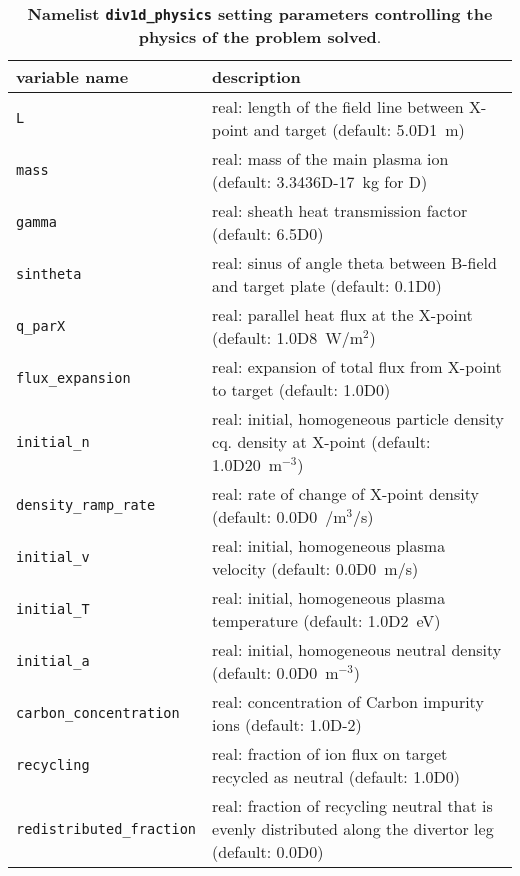 \documentclass[amsmath,amssymb,a4]{revtex4-2}
\begin{document}
\begin{table}[h]
\begin{center}
  \caption{{\bf Namelist {\tt div1d\_physics} setting parameters controlling the physics of the problem solved}.}
  \label{tab:input_physics}
  \begin{tabular}{|| l  | l ||}
    \hline\hline
    variable name                & description \\ \hline\hline
    {\tt L}                      & real: length of the field line between X-point and target (default: 5.0D1~m) \\ \hline
    {\tt mass}                   & real: mass of the main plasma ion (default: 3.3436D-17~kg for D) \\ \hline
    {\tt gamma}                  & real: sheath heat transmission factor (default: 6.5D0) \\ \hline
    {\tt sintheta}               & real: sinus of angle theta between B-field and target plate (default: 0.1D0) \\ \hline
    {\tt q\_parX}                & real: parallel heat flux at the X-point (default: 1.0D8~W/m$^2$) \\ \hline
    {\tt flux\_expansion}        & real: expansion of total flux from X-point to target (default: 1.0D0) \\ \hline
    {\tt initial\_n}             & real: initial, homogeneous particle density cq. density at X-point (default: 1.0D20~m$^{-3}$) \\ \hline
    {\tt density\_ramp\_rate}    & real: rate of change of X-point density (default: 0.0D0~/m$^3$/s) \\ \hline
    {\tt initial\_v}             & real: initial, homogeneous plasma velocity (default: 0.0D0~m/s) \\ \hline
    {\tt initial\_T}             & real: initial, homogeneous plasma temperature (default: 1.0D2~eV) \\ \hline
    {\tt initial\_a}             & real: initial, homogeneous neutral density (default: 0.0D0~m$^{-3}$) \\ \hline
    {\tt carbon\_concentration}  & real: concentration of Carbon impurity ions (default: 1.0D-2) \\ \hline
    {\tt recycling}              & real: fraction of ion flux on target recycled as neutral (default: 1.0D0) \\ \hline
    {\tt redistributed\_fraction}& real: fraction of recycling neutral that is evenly distributed along the divertor leg (default: 0.0D0) \\ \hline

\end{tabular}
\end{center}
\end{table}
\end{document}
